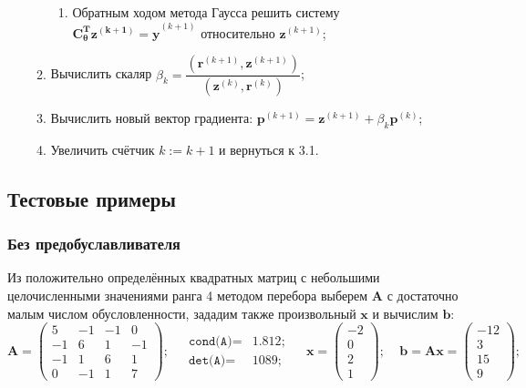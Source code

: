 \begin{enumerate}
\begin{enumerate}
\begin{enumerate}
            \item Обратным ходом метода Гаусса решить систему $\mathbf{C_\theta^T z^{(k+1)} = y}^{(k+1)}$ относительно $\mathbf{z}^{(k+1)}$;
        \end{enumerate}
        \item Вычислить скаляр $\beta_k=\dfrac{(\mathbf{r}^{(k+1)}, \mathbf{z}^{(k+1)})}{(\mathbf{z}^{(k)}, \mathbf{r}^{(k)})}$;
        \item Вычислить новый вектор градиента: $\mathbf{p}^{(k+1)}=\mathbf{z}^{(k+1)}+\beta_k\mathbf{p}^{(k)}$;
        \item Увеличить счётчик $k:=k+1$ и вернуться к 3.1.
    \end{enumerate}
\end{enumerate}


\subsection{Тестовые примеры}
\subsubsection{Без предобуславливателя}
Из положительно определённых квадратных матриц с небольшими целочисленными значениями ранга 4 методом перебора выберем $\mathbf{A}$ с достаточно малым числом обусловленности, зададим также произвольный $\mathbf{x}$ и вычислим $\mathbf{b}$:
\begin{equation}
    \mathbf{A} =
    \begin{pmatrix}
        5  & -1 & -1 & 0  \\
        -1 & 6  & 1  & -1 \\
        -1 & 1  & 6  & 1  \\
        0  & -1 & 1  & 7
    \end{pmatrix}; ~~~~~
    \begin{matrix}
    \texttt{cond(A)}=&1.812;\\
    \texttt{det(A)} =&1089;
    \end{matrix} ~~~~~
    \mathbf{x} = \begin{pmatrix} -2 \\ 0 \\ 2\\ 1 \end{pmatrix}; ~~~~~
    \mathbf{b=Ax} = \begin{pmatrix} -12 \\ 3 \\ 15 \\ 9 \end{pmatrix};
\end{equation}

